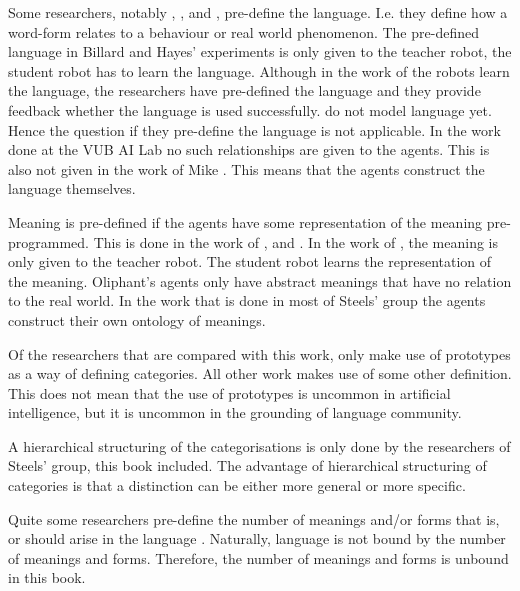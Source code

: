 Some researchers, notably \citet{billard:1997a}, \citet{cangelosiparisi:1998}, and \citet{yancostein}, pre-define the language. I.e. they define how a word-form relates to a behaviour or real world phenomenon. The pre-defined language in Billard and Hayes' experiments is only given to the teacher robot, the student robot has to learn the language. Although in the work of \citeauthor{yancostein} the robots learn the language, the researchers have pre-defined the language and they provide feedback whether the language is used successfully. \citet{rosenstein:1998a} do not model language yet. Hence the question if they pre-define the language is not applicable. In the work done at the VUB AI Lab no such relationships are given to the agents. This is also not given in the work of Mike \citet{oliphant:1997}. This means that the agents construct the language themselves. 

Meaning is pre-defined if the agents have some representation of the meaning pre-programmed. This is done in the work of \citet{billard:1997a}, \citet{oliphant:1997} and \citet{yancostein}. In the work of \citeauthor{billard:1997a}, the meaning is only given to the teacher robot. The student robot learns the representation of the meaning. Oliphant's agents only have abstract meanings that have no relation to the real world. In the work that is done in most of Steels' group the agents construct their own ontology of meanings.

Of the researchers that are compared with this work, only \citet{rosenstein:1998a} make use of prototypes as a way of defining categories. All other work makes use of some other definition. This does not mean that the use of prototypes is uncommon in artificial intelligence, but it is uncommon in the grounding of language community.

A hierarchical structuring of the categorisations is only done by the researchers of Steels' group, this book included. The advantage of hierarchical structuring of categories is that a distinction can be either more general or more specific.

Quite some researchers pre-define the number of meanings and/or forms that is, or should arise in the language \citep{billard:1997a,cangelosiparisi:1998,oliphant:1997,yancostein}. Naturally, language is not bound by the number of meanings and forms. Therefore, the number of meanings and forms is unbound in this book.

